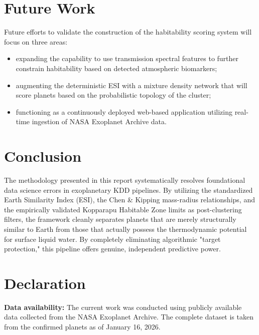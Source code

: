 \documentclass[conference]{IEEEtran}
\begin{document}
\section{Future Work}
Future efforts to validate the construction of the habitability scoring system will focus on three areas:
\begin{itemize}
    \item[\textbf{(i)}] expanding the capability to use transmission spectral features \cite{matchev2022} to further constrain habitability based on detected atmospheric biomarkers;
    \item[\textbf{(ii)}] augmenting the deterministic ESI with a mixture density network \cite{baumeister2023} that will score planets based on the probabilistic topology of the cluster;
    \item[\textbf{(iii)}] functioning as a continuously deployed web-based application utilizing real-time ingestion of NASA Exoplanet Archive data.
\end{itemize}

\section{Conclusion}
The methodology presented in this report systematically resolves foundational data science errors in exoplanetary KDD pipelines. By utilizing the standardized Earth Similarity Index (ESI), the Chen \& Kipping mass-radius relationships, and the empirically validated Kopparapu Habitable Zone limits as post-clustering filters, the framework cleanly separates planets that are merely structurally similar to Earth from those that actually possess the thermodynamic potential for surface liquid water. By completely eliminating algorithmic "target protection," this pipeline offers genuine, independent predictive power.

\section*{Declaration}
\textbf{Data availability:} The current work was conducted using publicly available data collected from the NASA Exoplanet Archive. The complete dataset is taken from the confirmed planets as of January 16, 2026. 
\end{document}
